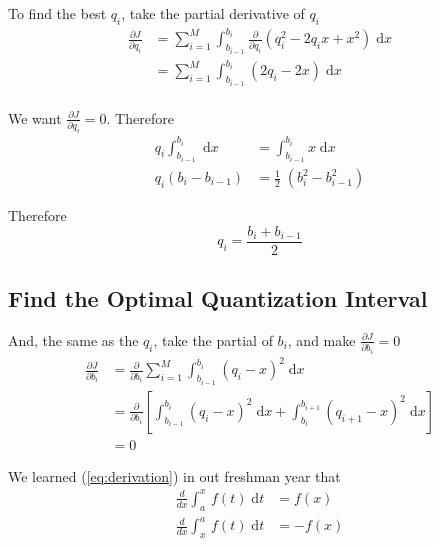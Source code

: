 \documentclass{article}
\begin{document}
To find the best $q_i$, take the partial derivative of $q_i$
\begin{equation*}
	\begin{aligned}
		\frac{\partial J}{\partial q_i} &= \sum_{i = 1}^{M} \int_{b_{i - 1}}^{b_i} \frac{\partial}{\partial q_i} (q_i^2 - 2q_ix + x^2) \; \mathrm{d}x \\
		&= \sum_{i = 1}^{M} \int_{b_{i - 1}}^{b_i} (2 q_i - 2x) \; \mathrm{d}x \\ 
	\end{aligned}
\end{equation*}

We want $\frac{\partial J}{\partial q_i} = 0$. Therefore \\ 
\begin{equation*}
	\begin{aligned}
		 q_i \int_{b_{i - 1}}^{b_i} \; \mathrm{d}x &=  \int_{b_{i - 1}}^{b_i} x \; \mathrm{d}x \\ 
		 q_i (b_i - b_{i - 1}) &= \frac12 \;  (b_i^2 - b_{i - 1}^2) 	 
	\end{aligned}
\end{equation*}

Therefore
\begin{equation}
	q_i = \frac{b_i + b_{i - 1}}{2} 
	\label{eq:qiResult}
\end{equation}

\subsection{Find the Optimal Quantization Interval}

And, the same as the $q_i$, take the partial of $b_i$, and make $\frac{\partial J}{\partial b_i} = 0$
\begin{equation*}
	\begin{aligned}
		\frac{\partial J}{\partial b_i} &= \frac{\partial}{\partial b_i} \sum_{i = 1}^{M} \int_{b_{i - 1}}^{b_i} (q_i - x)^2 \; \mathrm{d}x \\ 
		&= \frac{\partial}{\partial b_i} [\int_{b_{i - 1}}^{b_i} (q_i - x)^2 \; \mathrm{d}x + \int_{b_{i}}^{b_{i + 1}} (q_{i + 1} - x)^2 \; \mathrm{d}x] \\ 
		&= 0
	\end{aligned}
	\label{eq:biCondi}
\end{equation*}

We learned (\ref{eq:derivation}) in out freshman year that
\begin{equation}
\begin{aligned}
	\frac{d}{dx} \int_{a}^{x} \, f(t) \; \mathrm{d}t &= f(x) \\ 
	\frac{d}{dx} \int_{x}^{a} \, f(t) \; \mathrm{d}t &= - f(x)
\end{aligned}
\label{eq:derivation}
\end{equation}
\end{document}
